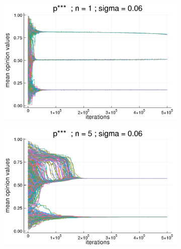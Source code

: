 \documentclass{article}
\begin{document}
    \begin{figure}[H]
      \centering
      
      \begin{subfigure}[b]{0.49\textwidth}
        \includegraphics[width=\textwidth]{img/compare-ps/Poodlcalculatep***n1-rho10e-5-sigma006-00intrans.png}
      \end{subfigure}
      \begin{subfigure}[b]{0.49\textwidth}
        \includegraphics[width=\textwidth]{img/compare-ps/Poodlcalculatep***n5-rho10e-5-sigma006-00intrans.png}
      \end{subfigure}
            \begin{subfigure}[b]{0.49\textwidth}

\end{subfigure}
\end{figure}
\end{document}
